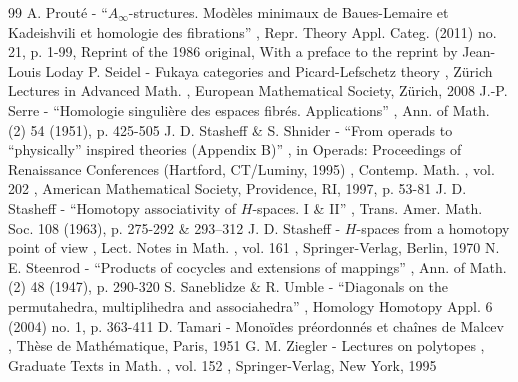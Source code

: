 \documentclass[11pt]{article}
\numberwithin{equation}{section}\providecommand{\No}{}
\theoremstyle{plain}
\theoremstyle{definition}
\begin{document}
\begin{thebibliography}{99}
 A. Prouté - “$A_\infty $-structures. Modèles minimaux de Baues-Lemaire et Kadeishvili et homologie des fibrations” , Repr. Theory Appl. Categ. (2011) no. 21, p. 1-99, Reprint of the 1986 original, With a preface to the reprint by Jean-Louis Loday
 P. Seidel - Fukaya categories and Picard-Lefschetz theory , Zürich Lectures in Advanced Math. , European Mathematical Society, Zürich, 2008
 J.-P. Serre - “Homologie singulière des espaces fibrés. Applications” , Ann. of Math. (2) 54 (1951), p. 425-505
 J. D. Stasheff \& S. Shnider - “From operads to “physically” inspired theories (Appendix B)” , in Operads: Proceedings of Renaissance Conferences (Hartford, CT/Luminy, 1995) , Contemp. Math. , vol. 202 , American Mathematical Society, Providence, RI, 1997, p. 53-81
 J. D. Stasheff - “Homotopy associativity of $H$-spaces. I \& II” , Trans. Amer. Math. Soc. 108 (1963), p. 275-292 \& 293–312
 J. D. Stasheff - $H$-spaces from a homotopy point of view , Lect. Notes in Math. , vol. 161 , Springer-Verlag, Berlin, 1970
 N. E. Steenrod - “Products of cocycles and extensions of mappings” , Ann. of Math. (2) 48 (1947), p. 290-320
 S. Saneblidze \& R. Umble - “Diagonals on the permutahedra, multiplihedra and associahedra” , Homology Homotopy Appl. 6 (2004) no. 1, p. 363-411
 D. Tamari - Monoïdes préordonnés et chaînes de Malcev , Thèse de Mathématique, Paris, 1951
 G. M. Ziegler - Lectures on polytopes , Graduate Texts in Math. , vol. 152 , Springer-Verlag, New York, 1995
\end{thebibliography}
\end{document}
